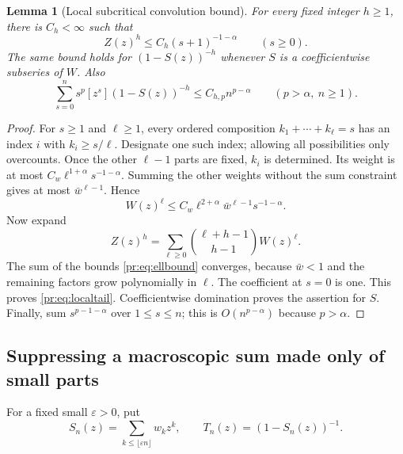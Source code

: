 \documentclass[11pt,a4paper]{article}
\newtheorem{lemma}[lemma]{Lemma}
\theoremstyle{definition}\newaliascnt{definition}{theorem}
\theoremstyle{remark}\newaliascnt{remark}{theorem}
\newcommand{\prcoef}[2]{[#1^{#2}]}
\begin{document}
\begin{lemma}[Local subcritical convolution bound]\label{pr:lem:local}
For every fixed integer $h\ge1$, there is $C_h<\infty$ such that
\begin{equation}
 \prcoef zs Z(z)^h\le C_h(s+1)^{-1-\alpha}\qquad(s\ge0).
 \label{pr:eq:localtail}
\end{equation}
The same bound holds for $(1-S(z))^{-h}$ whenever $S$ is a coefficientwise
subseries of $W$. Also
\begin{equation}
 \sum_{s=0}^n s^p\prcoef zs(1-S(z))^{-h}
 \le C_{h,p}n^{p-\alpha}\qquad(p>\alpha,
 \ n\ge1).
 \label{pr:eq:momentbound}
\end{equation}
\end{lemma}
\begin{proof}
For $s\ge1$ and $\ell\ge1$, every ordered composition $k_1+\cdots+k_\ell=s$
has an index $i$ with $k_i\ge s/\ell$. Designate one such index; allowing all
possibilities only overcounts. Once the other $\ell-1$ parts are fixed, $k_i$
is determined. Its weight is at most $C_w\ell^{1+\alpha}s^{-1-\alpha}$.
Summing the other weights without the sum constraint gives at most
$\bar w^{\ell-1}$. Hence
\begin{equation}
 \prcoef zs W(z)^\ell
 \le C_w\ell^{2+\alpha}\bar w^{\ell-1}s^{-1-\alpha}.
 \label{pr:eq:ellbound}
\end{equation}
Now expand
\[
 Z(z)^h=\sum_{\ell\ge0}\binom{\ell+h-1}{h-1}W(z)^\ell.
\]
The sum of the bounds \eqref{pr:eq:ellbound} converges, because $\bar w<1$
and the remaining factors grow polynomially in $\ell$. The coefficient at
$s=0$ is one. This proves \eqref{pr:eq:localtail}. Coefficientwise
domination proves the assertion for $S$. Finally, sum $s^{p-1-\alpha}$ over
$1\le s\le n$; this is $O(n^{p-\alpha})$ because $p>\alpha$.
\end{proof}

\subsection{Suppressing a macroscopic sum made only of small parts}
For a fixed small $\varepsilon>0$, put
\begin{equation}
 S_n(z)=\sum_{k\le\lfloor\varepsilon n\rfloor}w_kz^k,
 \qquad T_n(z)=(1-S_n(z))^{-1}.
 \label{pr:eq:smallkernel}
\end{equation}
\end{document}
